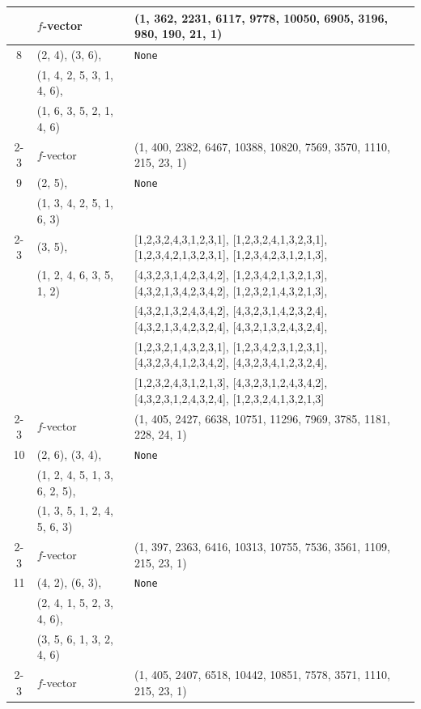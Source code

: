 \documentclass[10pt]{amsart}
\numberwithin{equation}{section}
\theoremstyle{plain}
\theoremstyle{definition}
\theoremstyle{remark}
\begin{document}
{\begin{longtable}{c|l|l}
		& $f$-vector & {(1, 362, 2231, 6117, 9778, 10050, 6905, 3196, 980, 190, 21, 1)} \\
		\midrule
		
		8 & (2, 4), (3, 6), & \texttt{None} \\
		& (1, 4, 2, 5, 3, 1, 4, 6), &  \\
		& (1, 6, 3, 5, 2, 1, 4, 6) &  \\ \cline{2-3}
		
		& $f$-vector & {(1, 400, 2382, 6467, 10388, 10820, 7569, 3570, 1110, 215, 23, 1)} \\
		\midrule
		
		9 & (2, 5), & \texttt{None} \\
		& (1, 3, 4, 2, 5, 1, 6, 3) &  \\ \cline{2-3}
		
		& (3, 5), & [1,2,3,2,4,3,1,2,3,1], [1,2,3,2,4,1,3,2,3,1], [1,2,3,4,2,1,3,2,3,1], [1,2,3,4,2,3,1,2,1,3], \\
		& (1, 2, 4, 6, 3, 5, 1, 2) & [4,3,2,3,1,4,2,3,4,2], [1,2,3,4,2,1,3,2,1,3], [4,3,2,1,3,4,2,3,4,2], [1,2,3,2,1,4,3,2,1,3], \\
		&  & [4,3,2,1,3,2,4,3,4,2], [4,3,2,3,1,4,2,3,2,4], [4,3,2,1,3,4,2,3,2,4], [4,3,2,1,3,2,4,3,2,4], \\
		&  & [1,2,3,2,1,4,3,2,3,1], [1,2,3,4,2,3,1,2,3,1], [4,3,2,3,4,1,2,3,4,2], [4,3,2,3,4,1,2,3,2,4], \\
		&  & [1,2,3,2,4,3,1,2,1,3], [4,3,2,3,1,2,4,3,4,2], [4,3,2,3,1,2,4,3,2,4], [1,2,3,2,4,1,3,2,1,3] \\ \cline{2-3}
		
		& $f$-vector & {(1, 405, 2427, 6638, 10751, 11296, 7969, 3785, 1181, 228, 24, 1)} \\
		\midrule
		
		10 & (2, 6), (3, 4), & \texttt{None} \\
		& (1, 2, 4, 5, 1, 3, 6, 2, 5), &  \\
		& (1, 3, 5, 1, 2, 4, 5, 6, 3) &  \\ \cline{2-3}
		
		& $f$-vector & {(1, 397, 2363, 6416, 10313, 10755, 7536, 3561, 1109, 215, 23, 1)} \\
		\midrule
		
		11 & (4, 2), (6, 3), & \texttt{None} \\
		& (2, 4, 1, 5, 2, 3, 4, 6), &  \\
		& (3, 5, 6, 1, 3, 2, 4, 6) &  \\ \cline{2-3}
		
		& $f$-vector & {(1, 405, 2407, 6518, 10442, 10851, 7578, 3571, 1110, 215, 23, 1)} \\
		\midrule
		

\end{longtable}}
\end{document}
